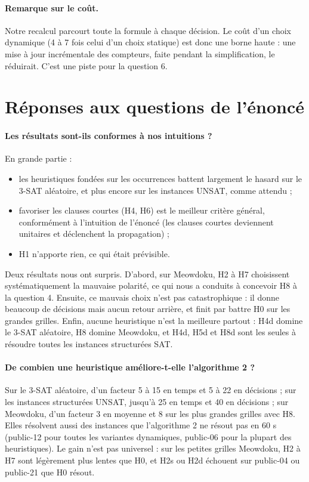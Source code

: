 \documentclass[11pt,a4paper]{article}
\begin{document}
\paragraph{Remarque sur le coût.} Notre recalcul parcourt toute la formule
à chaque décision. Le coût d'un choix dynamique (4 à 7 fois celui d'un choix
statique) est donc une borne haute : une mise à jour incrémentale des
compteurs, faite pendant la simplification, le réduirait. C'est une piste
pour la question 6.

\section{Réponses aux questions de l'énoncé}

\paragraph{Les résultats sont-ils conformes à nos intuitions ?} En grande
partie :
\begin{itemize}
  \item les heuristiques fondées sur les occurrences battent largement le
    hasard sur le 3-SAT aléatoire, et plus encore sur les instances UNSAT,
    comme attendu ;
  \item favoriser les clauses courtes (H4, H6) est le meilleur critère
    général, conformément à l'intuition de l'énoncé (les clauses courtes
    deviennent unitaires et déclenchent la propagation) ;
  \item H1 n'apporte rien, ce qui était prévisible.
\end{itemize}
Deux résultats nous ont surpris. D'abord, sur Meowdoku, H2 à H7 choisissent
systématiquement la mauvaise polarité, ce qui nous a conduits à concevoir
H8 à la question 4. Ensuite, ce mauvais choix n'est pas catastrophique :
il donne beaucoup de décisions mais aucun retour arrière, et finit par
battre H0 sur les grandes grilles. Enfin, aucune heuristique n'est la
meilleure partout : H4d domine le 3-SAT aléatoire, H8 domine Meowdoku, et
H4d, H5d et H8d sont les seules à résoudre toutes les instances
structurées SAT.

\paragraph{De combien une heuristique améliore-t-elle l'algorithme 2 ?}
Sur le 3-SAT aléatoire, d'un facteur 5 à 15 en temps et 5 à 22 en
décisions ; sur les instances structurées UNSAT, jusqu'à 25 en temps et 40
en décisions ; sur Meowdoku, d'un facteur 3 en moyenne et 8 sur les plus
grandes grilles avec H8. Elles résolvent aussi des instances que
l'algorithme 2 ne résout pas en 60 s (public-12 pour toutes les variantes
dynamiques, public-06 pour la plupart des heuristiques). Le gain n'est pas
universel : sur les petites grilles Meowdoku, H2 à H7 sont légèrement plus
lentes que H0, et H2s ou H2d échouent sur public-04 ou public-21 que H0
résout.
\end{document}
